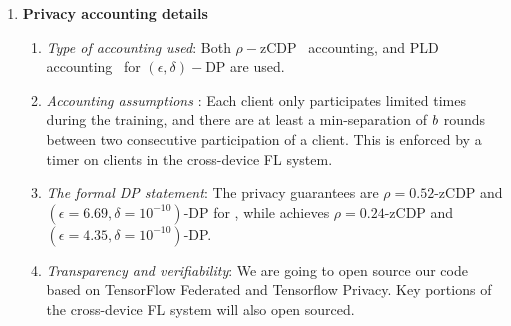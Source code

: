 \documentclass{article}
\begin{document}
\begin{enumerate}
\begin{enumerate}
    \end{enumerate}
    \item \textbf{Privacy accounting details}
    \begin{enumerate}
        \item \textit{Type of accounting used}: Both $\rho-$zCDP~\citep{bun2016concentrated} accounting, and PLD accounting~\citep{pldlib} for $(\epsilon, \delta)-$DP are used.
        \item \textit{Accounting assumptions }: Each client only participates limited times during the training, and there are at least a min-separation of $b$ rounds between two consecutive participation of a client. This is enforced by a timer on clients in the cross-device FL system.    
        \item \textit{The formal DP statement}: The privacy guarantees are $\rho{=}0.52$-zCDP and $(\epsilon{=}6.69, \delta{=}10^{-10})$-DP for \onlinetreeagg, while \BANDMF achieves $\rho{=}0.24$-zCDP and $(\epsilon{=}4.35, \delta{=}10^{-10})$-DP.
        \item \textit{Transparency and verifiability}: We are going to open source our code based on TensorFlow Federated and Tensorflow Privacy. Key portions of the cross-device FL system will also open sourced.
    \end{enumerate}
\end{enumerate}
\end{document}
